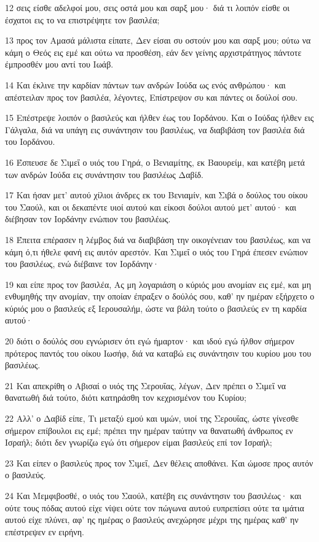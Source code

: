 \par 12 σεις είσθε αδελφοί μου, σεις οστά μου και σαρξ μου· διά τι λοιπόν είσθε οι έσχατοι εις το να επιστρέψητε τον βασιλέα;
\par 13 προς τον Αμασά μάλιστα είπατε, Δεν είσαι συ οστούν μου και σαρξ μου; ούτω να κάμη ο Θεός εις εμέ και ούτω να προσθέση, εάν δεν γείνης αρχιστράτηγος πάντοτε έμπροσθέν μου αντί του Ιωάβ.
\par 14 Και έκλινε την καρδίαν πάντων των ανδρών Ιούδα ως ενός ανθρώπου· και απέστειλαν προς τον βασιλέα, λέγοντες, Επίστρεψον συ και πάντες οι δούλοί σου.
\par 15 Επέστρεψε λοιπόν ο βασιλεύς και ήλθεν έως του Ιορδάνου. Και ο Ιούδας ήλθεν εις Γάλγαλα, διά να υπάγη εις συνάντησιν του βασιλέως, να διαβιβάση τον βασιλέα διά του Ιορδάνου.
\par 16 Έσπευσε δε Σιμεΐ ο υιός του Γηρά, ο Βενιαμίτης, εκ Βαουρείμ, και κατέβη μετά των ανδρών Ιούδα εις συνάντησιν του βασιλέως Δαβίδ.
\par 17 Και ήσαν μετ' αυτού χίλιοι άνδρες εκ του Βενιαμίν, και Σιβά ο δούλος του οίκου του Σαούλ, και οι δεκαπέντε υιοί αυτού και είκοσι δούλοι αυτού μετ' αυτού· και διέβησαν τον Ιορδάνην ενώπιον του βασιλέως.
\par 18 Έπειτα επέρασεν η λέμβος διά να διαβιβάση την οικογένειαν του βασιλέως, και να κάμη ό,τι ήθελε φανή εις αυτόν αρεστόν. Και Σιμεΐ ο υιός του Γηρά έπεσεν ενώπιον του βασιλέως, ενώ διέβαινε τον Ιορδάνην·
\par 19 και είπε προς τον βασιλέα, Ας μη λογαριάση ο κύριός μου ανομίαν εις εμέ, και μη ενθυμηθής την ανομίαν, την οποίαν έπραξεν ο δούλός σου, καθ' ην ημέραν εξήρχετο ο κύριός μου ο βασιλεύς εξ Ιερουσαλήμ, ώστε να βάλη τούτο ο βασιλεύς εν τη καρδία αυτού·
\par 20 διότι ο δούλός σου εγνώρισεν ότι εγώ ήμαρτον· και ιδού εγώ ήλθον σήμερον πρότερος παντός του οίκου Ιωσήφ, διά να καταβώ εις συνάντησιν του κυρίου μου του βασιλέως.
\par 21 Και απεκρίθη ο Αβισαί ο υιός της Σερουΐας, λέγων, Δεν πρέπει ο Σιμεΐ να θανατωθή διά τούτο, διότι κατηράσθη τον κεχρισμένον του Κυρίου;
\par 22 Αλλ' ο Δαβίδ είπε, Τι μεταξύ εμού και υμών, υιοί της Σερουΐας, ώστε γίνεσθε σήμερον επίβουλοι εις εμέ; πρέπει την ημέραν ταύτην να θανατωθή άνθρωπος εν Ισραήλ; διότι δεν γνωρίζω εγώ ότι σήμερον είμαι βασιλεύς επί τον Ισραήλ;
\par 23 Και είπεν ο βασιλεύς προς τον Σιμεΐ, Δεν θέλεις αποθάνει. Και ώμοσε προς αυτόν ο βασιλεύς.
\par 24 Και Μεμφιβοσθέ, ο υιός του Σαούλ, κατέβη εις συνάντησιν του βασιλέως· και ούτε τους πόδας αυτού είχε νίψει ούτε τον πώγωνα αυτού ευπρεπίσει ούτε τα ιμάτια αυτού είχε πλύνει, αφ' ης ημέρας ο βασιλεύς ανεχώρησε μέχρι της ημέρας καθ' ην επέστρεψεν εν ειρήνη.
